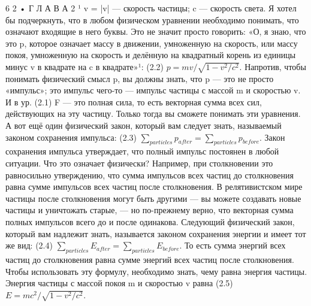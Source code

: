 \documentclass[10pt,oneside]{article}
\begin{document}
6 2 • Г Л А В А  2 ¹ v = |v| --- скорость частицы; c --- скорость света. Я хотел бы подчеркнуть, что в любом физическом уравнении необходимо понимать, что означают входящие в него буквы. Это не значит просто говорить: «О, я знаю, что это p, которое означает массу в движении, умноженную на скорость, или массу покоя, умноженную на скорость и делённую на квадратный корень из единицы минус v в квадрате на c в квадрате»¹: (2.2) \(p = mv / \sqrt{1 - v^2/c^2}\). Напротив, чтобы понимать физический смысл p, вы должны знать, что p --- это не просто «импульс»; это импульс чего-то --- импульс частицы с массой m и скоростью v. И в ур. (2.1) F --- это полная сила, то есть векторная сумма всех сил, действующих на эту частицу. Только тогда вы сможете понимать эти уравнения. А вот ещё один физический закон, который вам следует знать, называемый законом сохранения импульса: (2.3) \(\sum_{particles} p_{after} = \sum_{particles} p_{before}\). Закон сохранения импульса утверждает, что полный импульс постоянен в любой ситуации. Что это означает физически? Например, при столкновении это равносильно утверждению, что сумма импульсов всех частиц до столкновения равна сумме импульсов всех частиц после столкновения. В релятивистском мире частицы после столкновения могут быть другими --- вы можете создавать новые частицы и уничтожать старые, --- но по-прежнему верно, что векторная сумма полных импульсов всего до и после одинакова. Следующий физический закон, который вам надлежит знать, называется законом сохранения энергии и имеет тот же вид: (2.4) \(\sum_{particles} E_{after} = \sum_{particles} E_{before}\). То есть сумма энергий всех частиц до столкновения равна сумме энергий всех частиц после столкновения. Чтобы использовать эту формулу, необходимо знать, чему равна энергия частицы. Энергия частицы с массой покоя m и скоростью v равна (2.5) \(E = mc^2 / \sqrt{1 - v^2/c^2}\).\par
\end{document}
